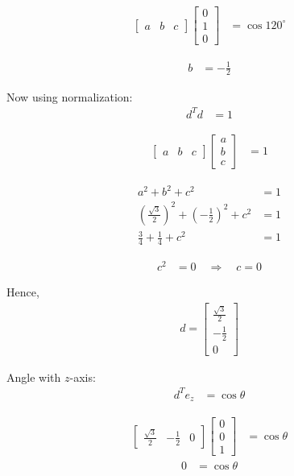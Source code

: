 \documentclass[journal]{IEEEtran}
\begin{document}
\begin{align}
\begin{bmatrix} a & b & c \end{bmatrix}
\begin{bmatrix} 0 \\ 1 \\ 0 \end{bmatrix} &= \cos 120^\circ 
\end{align}


\begin{align}
b &= -\tfrac{1}{2} 
\end{align}

Now using normalization:
\begin{align}
d^T d &= 1 
\end{align}

\begin{align}
\begin{bmatrix} a & b & c \end{bmatrix}
\begin{bmatrix} a \\ b \\ c \end{bmatrix} &= 1 
\end{align}


\begin{align}
a^2 + b^2 + c^2 &= 1 \\
\left(\tfrac{\sqrt{3}}{2}\right)^2 + \left(-\tfrac{1}{2}\right)^2 + c^2 &= 1 \\
\tfrac{3}{4} + \tfrac{1}{4} + c^2 &= 1 
\end{align}


\begin{align}
c^2 &= 0 \quad \Rightarrow \quad c = 0
\end{align}

Hence,
\begin{align}
d = \begin{bmatrix} \tfrac{\sqrt{3}}{2} \\[6pt] -\tfrac{1}{2} \\[6pt] 0 \end{bmatrix}
\end{align}


Angle with $z$-axis:
\begin{align}
d^T e_z &= \cos \theta 
\end{align}

\begin{align}
\begin{bmatrix} \tfrac{\sqrt{3}}{2} & -\tfrac{1}{2} & 0 \end{bmatrix}
\begin{bmatrix} 0 \\ 0 \\ 1 \end{bmatrix} &= \cos \theta 
\end{align}
\begin{align}
0 &= \cos \theta 
\end{align}
\end{document}
